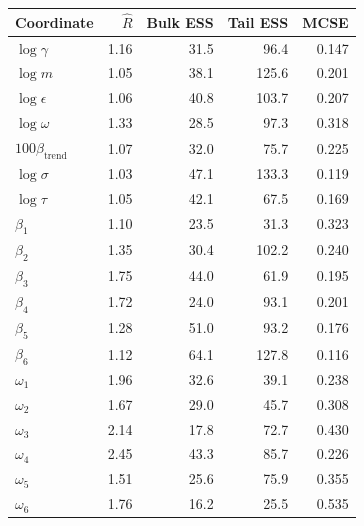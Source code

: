\begin{tabular}{lrrrr}
\toprule
Coordinate & $\widehat R$ & Bulk ESS & Tail ESS & MCSE \\
\midrule
$\log\gamma$ & 1.16 & 31.5 & 96.4 & 0.147 \\
$\log m$ & 1.05 & 38.1 & 125.6 & 0.201 \\
$\log\epsilon$ & 1.06 & 40.8 & 103.7 & 0.207 \\
$\log\omega$ & 1.33 & 28.5 & 97.3 & 0.318 \\
$100\beta_{\mathrm{trend}}$ & 1.07 & 32.0 & 75.7 & 0.225 \\
$\log\sigma$ & 1.03 & 47.1 & 133.3 & 0.119 \\
$\log\tau$ & 1.05 & 42.1 & 67.5 & 0.169 \\
$\beta_1$ & 1.10 & 23.5 & 31.3 & 0.323 \\
$\beta_2$ & 1.35 & 30.4 & 102.2 & 0.240 \\
$\beta_3$ & 1.75 & 44.0 & 61.9 & 0.195 \\
$\beta_4$ & 1.72 & 24.0 & 93.1 & 0.201 \\
$\beta_5$ & 1.28 & 51.0 & 93.2 & 0.176 \\
$\beta_6$ & 1.12 & 64.1 & 127.8 & 0.116 \\
$\omega_1$ & 1.96 & 32.6 & 39.1 & 0.238 \\
$\omega_2$ & 1.67 & 29.0 & 45.7 & 0.308 \\
$\omega_3$ & 2.14 & 17.8 & 72.7 & 0.430 \\
$\omega_4$ & 2.45 & 43.3 & 85.7 & 0.226 \\
$\omega_5$ & 1.51 & 25.6 & 75.9 & 0.355 \\
$\omega_6$ & 1.76 & 16.2 & 25.5 & 0.535 \\
\bottomrule
\end{tabular}
